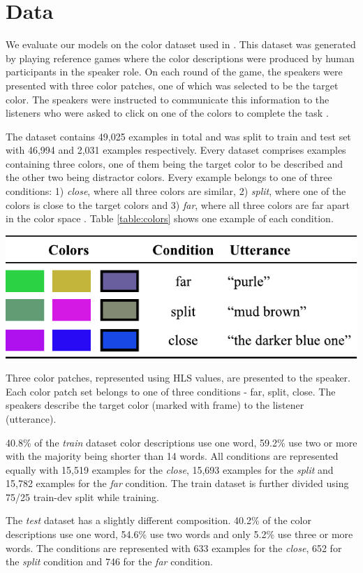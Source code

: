 \section{Data}

We evaluate our models on the color dataset used in \citep{monroe-2017-colors}. This dataset was generated by playing reference games where the color descriptions were produced by human participants in the speaker role. On each round of the game, the speakers were presented with three color patches, one of which was selected to be the target color. The speakers were instructed to communicate this information to the listeners who were asked to click on one of the colors to complete the task \citep{monroe-2017-colors}.

\par
The dataset contains 49,025 examples in total and was split to train and test set with 46,994 and 2,031 examples respectively. Every dataset comprises examples containing three colors, one of them being the target color to be described and the other two being distractor colors. Every example belongs to one of three conditions: 1) \emph{close}, where all three colors are similar, 2) \emph{split}, where one of the colors is close to the target colors and 3) \emph{far}, where all three colors are far apart in the color space \citep{monroe-2017-colors}. Table \ref{table:colors} shows one example of each condition.

\begin{table}[ht]
\centering
\includegraphics[width=\columnwidth]{assets/colors.pdf}
\caption[Colors]{Three color patches, represented using HLS values, are presented to the speaker. Each color patch set belongs to one of three conditions - far, split, close. The speakers describe the target color (marked with frame) to the listener (utterance).}
\label{table:colors}
\end{table}

\par
40.8\% of the \emph{train} dataset color descriptions use one word, 59.2\% use two or more with the majority being shorter than 14 words. All conditions are represented equally with 15,519 examples for the \emph{close}, 15,693 examples for the \emph{split} and 15,782 examples for the \emph{far} condition. The train dataset is further divided using 75/25 train-dev split while training.

\par
The \emph{test} dataset has a slightly different composition. 40.2\% of the color descriptions use one word, 54.6\% use two words and only 5.2\% use three or more words. The conditions are represented with 633 examples for the \emph{close}, 652 for the \emph{split} condition and 746 for the \emph{far} condition.